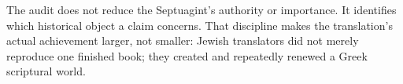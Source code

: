 The audit does not reduce the Septuagint's authority or importance. It identifies which historical object a claim concerns. That discipline makes the translation's actual achievement larger, not smaller: Jewish translators did not merely reproduce one finished book; they created and repeatedly renewed a Greek scriptural world.
